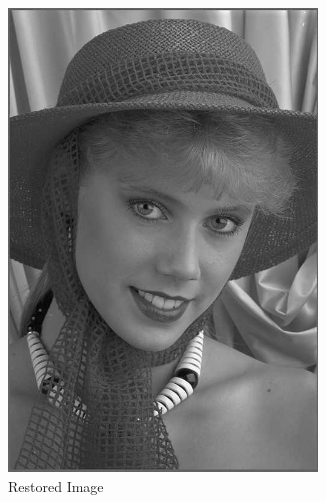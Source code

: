 \documentclass{article}
\begin{document}
\begin{figure}[!htb]
\begin{subfigure}{0.3\textwidth}
					\includegraphics[width=0.9\textwidth]{img03y_2.png}
					\caption{Restored Image}
				\end{subfigure}
				\begin{subfigure}{0.3\textwidth}

\end{subfigure}
\end{figure}
\end{document}

